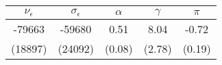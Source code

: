 \begin{tabular}{ccccc}\toprule$\nu_{\epsilon}$ & $\sigma_{\epsilon}$ & $\alpha$ & $\gamma$ & $\pi$ \\ \midrule -79663 &  -59680 & 0.51 &  8.04 & -0.72 \\(18897) & (24092) & (0.08) & (2.78) & (0.19)\\\bottomrule\end{tabular}